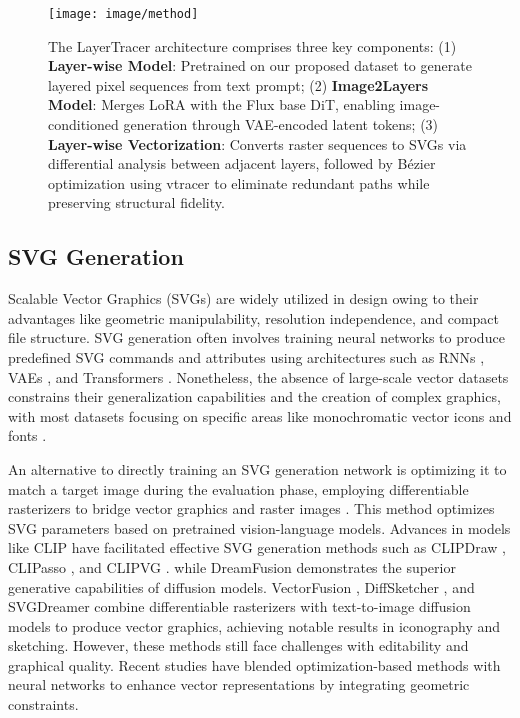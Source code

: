 \begin{figure*}[ht]
    \centering
    \texttt{[image: image/method]} %
    \caption{The LayerTracer architecture comprises three key components: (1) \textbf{Layer-wise Model}: Pretrained on our proposed dataset to generate layered pixel sequences from text prompt; (2) \textbf{Image2Layers Model}: Merges LoRA with the Flux base DiT, enabling image-conditioned generation through VAE-encoded latent tokens; (3) \textbf{Layer-wise Vectorization}: Converts raster sequences to SVGs via differential analysis between adjacent layers, followed by Bézier optimization using vtracer to eliminate redundant paths while preserving structural fidelity.}
    \label{method}
\end{figure*}


\subsection{SVG Generation }
Scalable Vector Graphics (SVGs) are widely utilized in design owing to their advantages like geometric manipulability, resolution independence, and compact file structure. SVG generation often involves training neural networks to produce predefined SVG commands and attributes using architectures such as RNNs \cite{im2vec}, VAEs \cite{svg2, svg+vae, strokenuwa}, and Transformers \cite{svg2, deepvecfont, iconshop}. Nonetheless, the absence of large-scale vector datasets constrains their generalization capabilities and the creation of complex graphics, with most datasets focusing on specific areas like monochromatic vector icons \cite{iconshop} and fonts \cite{deepvecfont, clipfont}.

An alternative to directly training an SVG generation network is optimizing it to match a target image during the evaluation phase, employing differentiable rasterizers to bridge vector graphics and raster images \cite{diffvg}. This method optimizes SVG parameters based on pretrained vision-language models. Advances in models like CLIP \cite{clip} have facilitated effective SVG generation methods such as CLIPDraw \cite{clipdraw}, CLIPasso \cite{clipasso}, and CLIPVG \cite{clipvg}. while DreamFusion \cite{dreamfusion} demonstrates the superior generative capabilities of diffusion models. VectorFusion \cite{vectorfusion}, DiffSketcher \cite{diffsketcher}, and SVGDreamer combine differentiable rasterizers with text-to-image diffusion models to produce vector graphics, achieving notable results in iconography and sketching. However, these methods still face challenges with editability and graphical quality. Recent studies \cite{nivel, t2v} have blended optimization-based methods with neural networks to enhance vector representations by integrating geometric constraints. 

